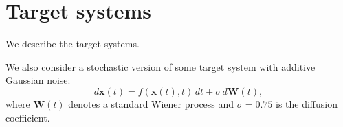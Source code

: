 \documentclass{article}
\theoremstyle{definition} \newtheorem{definition}{Definition}  \newtheorem{example}{Example}
\theoremstyle{remark} \newtheorem{remark}{Remark}
\newcounter{ct}
\begin{document}


%








\newpage
 \section{Target systems}\label{sec:target_systems}
We describe the target systems.

We also consider a stochastic version of some target system with additive Gaussian noise:
\begin{equation}\label{eq:sde}
d\mathbf{x}(t) = f(\mathbf{x}(t), t)\,dt + \sigma\,d\mathbf{W}(t),
\end{equation}
where $\mathbf{W}(t)$ denotes a standard Wiener process and $\sigma = 0.75$ is the diffusion coefficient.
\end{document}
